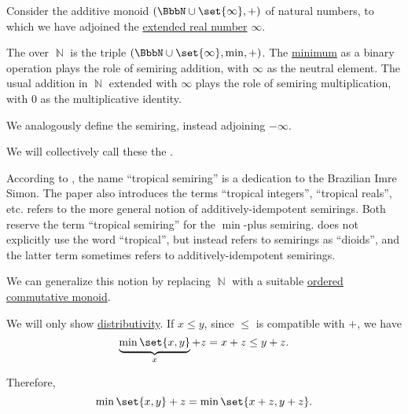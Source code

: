 \begin{definition}\label{def:tropical_semiring}
  Consider the additive monoid \( (\BbbN \cup \set{ \infty }, +) \) of natural numbers, to which we have adjoined the \hyperref[def:extended_real_numbers]{extended real number} \( \infty \).

  The  over \( \BbbN \) is the triple \( (\BbbN \cup \set{ \infty }, \min, +) \). The \hyperref[def:extremal_points/maximum_and_minimum]{minimum} as a binary operation plays the role of semiring addition, with \( \infty \) as the neutral element. The usual addition in \( \BbbN \) extended with \( \infty \) plays the role of semiring multiplication, with \( 0 \) as the multiplicative identity.

  We analogously define the  semiring, instead adjoining \( -\infty \).

  We will collectively call these the .
\end{definition}
\begin{comments}
  \item According to , the name \enquote{tropical semiring} is a dedication to the Brazilian Imre Simon. The paper also introduces the terms \enquote{tropical integers}, \enquote{tropical reals}, etc.  refers to the more general notion of additively-idempotent semirings. Both reserve the term \enquote{tropical semiring} for the \( \min \)-plus semiring.  does not explicitly use the word \enquote{tropical}, but instead refers to semirings as \enquote{dioids}, and the latter term sometimes refers to additively-idempotent semirings.

  \item We can generalize this notion by replacing \( \BbbN \) with a suitable \hyperref[def:ordered_semigroup]{ordered} \hyperref[def:monoid/commutative]{commutative monoid}.
\end{comments}
\begin{defproof}
  We will only show \hyperref[def:semiring/left_distributivity]{distributivity}. If \( x \leq y \), since \( \leq \) is compatible with \( + \), we have
  \begin{equation*}
    \underbrace{\min\set{ x, y }}_{x} + z = x + z \leq y + z.
  \end{equation*}

  Therefore,
  \begin{equation*}
    \min\set{ x, y } + z = \min\set{ x + z , y + z }.
  \end{equation*}
\end{defproof}

